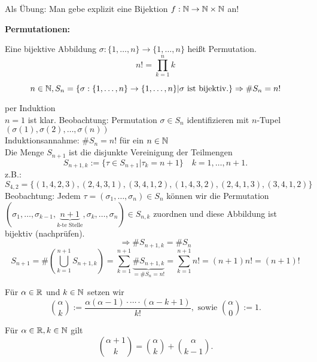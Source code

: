 \documentclass[../ana1.tex]{subfiles}
\begin{document}
\begin{bem}
	Als Übung: Man gebe explizit eine Bijektion \(f : \mathbb{N} \rightarrow \mathbb{N} \times \mathbb{N} \) an!
\end{bem}
\textbf{Permutationen:}
\begin{defi}
	Eine bijektive Abbildung \(\sigma : \{1,\ldots,n\} \rightarrow \{1,\ldots,n\} \) heißt Permutation.
	\[n! = \prod_{k=1}^{n}k\]
\end{defi}
\begin{satz}
	\[n\in\mathbb{N}, S_n = \{\sigma: \{1,\ldots,n\}\rightarrow \{1,\ldots,n\} | \sigma \text{ ist bijektiv.}\} \Rightarrow \# S_n = n!\]
\end{satz}
\begin{bew} per Induktion\\
	\(n = 1\) ist klar.
	Beobachtung: Permutation \(\sigma \in S_n\) identifizieren mit \(n\)-Tupel \( (\sigma(1), \sigma(2), \ldots, \sigma(n)) \) \\
	Induktionsannahme: \( \# S_n = n!\) für ein \(n\in\mathbb{N} \) \\
	Die Menge \(S_{n+1}\) ist die disjunkte Vereinigung der Teilmengen
	\[S_{n+1, k} := \{\tau \in S_{n+1} | \tau_k = n+1 \} \quad k = 1,\ldots, n+1.\]
	z.B.: \[S_{4,2} = \{ (1,4,2,3), (2,4,3,1), (3,4,1,2), (1,4,3,2), (2,4,1,3), (3,4,1,2) \} \]
	Beobachtung: Jedem \(\tau = (\sigma_1,\ldots,\sigma_n)\in S_n\) können wir die Permutation \( (\sigma_1, \ldots, \sigma_{k-1}, \underbrace{n+1}_{k\text{-te Stelle}}, \sigma_k, \ldots, \sigma_n) \in S_{n,k} \) zuordnen und diese Abbildung ist bijektiv (nachprüfen).
	\[\Rightarrow \# S_{n+1,k} = \# S_n \]
	\[ S_{n+1} = \# (\bigcup_{k=1}^{n+1} S_{n+1,k} ) = \sum_{k=1}^{n+1} \underbrace{\# S_{n+1,k}}_{=\#S_n = n!} = \sum_{k=1}^{n+1} n! = (n+1)n! = (n+1)! \]
\end{bew}
\begin{defi}[Binomialkoeffizient]
	Für \(\alpha \in\mathbb{R} \) und \( k\in\mathbb{N} \) setzen wir
	\[ \binom{\alpha}{k} := \frac{\alpha(\alpha-1)\cdot\cdots\cdot(\alpha-k+1)}{k!}, \text{ sowie } \binom{\alpha}{0} := 1. \]
\end{defi}
\begin{lem}
	Für \( \alpha\in\mathbb{R}, k\in\mathbb{N} \) gilt \[ \binom{\alpha + 1}{k} = \binom{\alpha}{k} + \binom{\alpha}{k-1}. \]
\end{lem}
\end{document}
